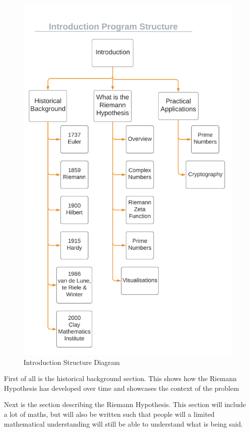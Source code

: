 \documentclass{article}
\begin{document}
\begin{figure}[h]
    \centering
    \captionsetup{justification=centering}
    \includegraphics[scale=0.385]{introduction-structure-diagram}
    \caption{Introduction Structure Diagram}
\end{figure}

First of all is the historical background section. This shows how the Riemann Hypothesis has developed over time and showcases the context of the problem

Next is the section describing the Riemann Hypothesis. This section will include a lot of maths, but will also be written such that people will a limited mathematical understanding will still be able to understand what is being said.
\end{document}
